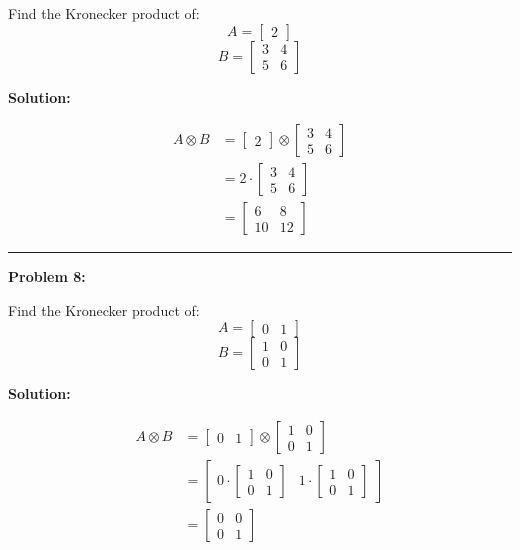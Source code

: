 \documentclass[
  letterpaper,
  DIV=11,
  numbers=noendperiod]{scrreprt}
\theoremstyle{plain}
\theoremstyle{definition}
\theoremstyle{remark}
\begin{document}
Find the Kronecker product of: \[A=\begin{bmatrix}2\end{bmatrix}\]
\[B=\begin{bmatrix}3&4\\5&6\end{bmatrix}\]

\textbf{Solution:}

\begin{align*}
A \otimes B &= \begin{bmatrix}2\end{bmatrix} \otimes \begin{bmatrix}3&4\\5&6\end{bmatrix} \\
&= 2 \cdot \begin{bmatrix}3&4\\5&6\end{bmatrix} \\
&= \begin{bmatrix}
6 & 8 \\
10 & 12
\end{bmatrix}
\end{align*}

\begin{center}\rule{0.5\linewidth}{0.5pt}\end{center}

\textbf{Problem 8:}

Find the Kronecker product of: \[A=\begin{bmatrix}0&1\end{bmatrix}\]
\[B=\begin{bmatrix}1&0\\0&1\end{bmatrix}\]

\textbf{Solution:}

\begin{align*}
A \otimes B &= \begin{bmatrix}0&1\end{bmatrix} \otimes \begin{bmatrix}1&0\\0&1\end{bmatrix} \\
&= \begin{bmatrix}
0 \cdot \begin{bmatrix}1&0\\0&1\end{bmatrix} & 1 \cdot \begin{bmatrix}1&0\\0&1\end{bmatrix}
\end{bmatrix} \\
&= \begin{bmatrix}
0 & 0 \\
0 & 1
\end{bmatrix}
\end{align*}
\end{document}

